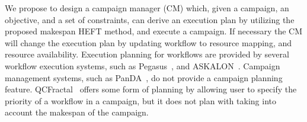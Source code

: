 
We propose to design a campaign manager (CM) which, given a campaign, an objective, and a set of constraints, can derive an execution plan by utilizing the proposed makespan HEFT method, and execute a campaign.
If necessary the CM will change the execution plan by updating workflow to resource mapping, and resource availability.
Execution planning for workflows are provided by several workflow execution systems, such as Pegasus~\cite{deelman2015pegasus}, and ASKALON~\cite{fahringer2005askalon}.
Campaign management systems, such as PanDA~\cite{maeno2008panda}, do not provide a campaign planning feature.
QCFractal~\cite{qcfractal} offers some form of planning by allowing user to specify the priority of a workflow in a campaign, but it does not plan with taking into account the makespan of the campaign.


